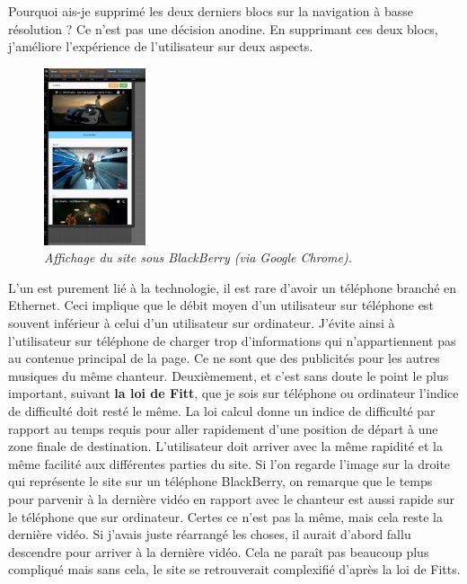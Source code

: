 \documentclass{article}
\begin{document}
\newpage

\hspace*{0.6cm}Pourquoi ais-je supprim\'e les deux derniers blocs sur la navigation \`a basse r\'esolution ? Ce n'est pas une d\'ecision anodine. En supprimant ces deux blocs, j'am\'eliore l'exp\'erience de l'utilisateur sur deux aspects.\\
\begin{figure}
\vspace{-13pt}
\centering
\includegraphics[width=3cm]{blackberry}
\caption{\textit{Affichage du site sous BlackBerry (via Google Chrome).}}
\end{figure} 
{\hspace*{0.6cm}L'un est purement li\'e \`a la technologie, il est rare d'avoir un t\'el\'ephone branch\'e en Ethernet. Ceci implique que le d\'ebit moyen d'un utilisateur sur t\'el\'ephone est souvent inf\'erieur \`a celui d'un utilisateur sur ordinateur. J'\'evite ainsi \`a l'utilisateur sur t\'el\'ephone de charger trop d'informations qui n'appartiennent pas au contenue principal de la page. Ce ne sont que des publicit\'es pour les autres musiques du m\^eme chanteur. Deuxi\`emement, et c'est sans doute le point le plus important, suivant \textbf{la loi de Fitt}, que je sois sur t\'el\'ephone ou ordinateur l'indice de difficult\'e doit rest\'e le m\^eme. La loi calcul donne un indice de difficult\'e par rapport au temps requis pour aller rapidement d'une position de d\'epart \`a une zone finale de destination. L'utilisateur doit arriver avec la m\^eme rapidit\'e et la m\^eme facilit\'e aux diff\'erentes parties du site. Si l'on regarde l'image sur la droite qui repr\'esente le site sur un t\'el\'ephone BlackBerry, on remarque que le temps pour parvenir \`a la derni\`ere vid\'eo en rapport avec le chanteur est aussi rapide sur le t\'el\'ephone que sur ordinateur. Certes ce n'est pas la m\^eme, mais cela reste la derni\`ere vid\'eo. Si j'avais juste r\'earrang\'e les choses, il aurait d'abord fallu descendre pour arriver \`a la derni\`ere vid\'eo. Cela ne para\^it pas beaucoup plus compliqu\'e mais sans cela, le site se retrouverait complexifi\'e d'apr\`es la loi de Fitts.}\\
\end{document}
